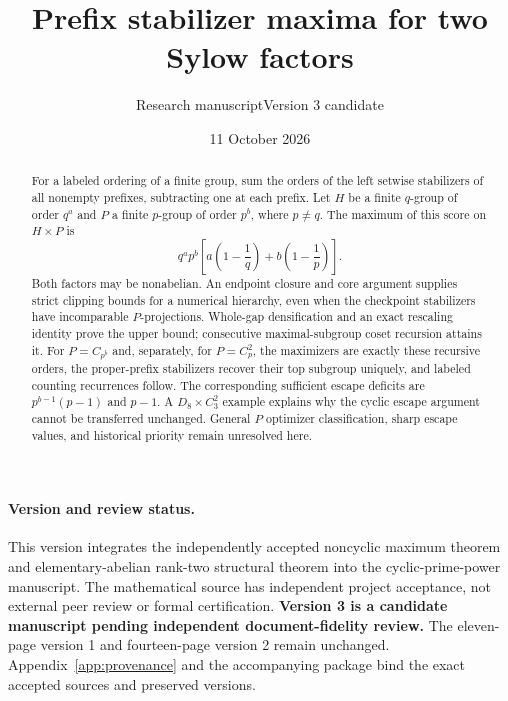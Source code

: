 \documentclass[11pt,letterpaper]{article}
\title{\bfseries Prefix stabilizer maxima for two Sylow factors}
\author{Research manuscript\quad Version 3 candidate}
\date{11 October 2026}
\theoremstyle{definition}\newtheorem{definition}{Definition}
\begin{document}
\maketitle\thispagestyle{plain}
\begin{abstract}
For a labeled ordering of a finite group, sum the orders of the left setwise stabilizers of all nonempty prefixes, subtracting one at each prefix. Let $H$ be a finite $q$-group of order $q^a$ and $P$ a finite $p$-group of order $p^b$, where $p\ne q$. The maximum of this score on $H\times P$ is
\[
q^ap^b\left[a\left(1-\frac1q\right)+b\left(1-\frac1p\right)\right].
\]
Both factors may be nonabelian. An endpoint closure and core argument supplies strict clipping bounds for a numerical hierarchy, even when the checkpoint stabilizers have incomparable $P$-projections. Whole-gap densification and an exact rescaling identity prove the upper bound; consecutive maximal-subgroup coset recursion attains it. For $P=C_{p^b}$ and, separately, for $P=C_p^2$, the maximizers are exactly these recursive orders, the proper-prefix stabilizers recover their top subgroup uniquely, and labeled counting recurrences follow. The corresponding sufficient escape deficits are $p^{b-1}(p-1)$ and $p-1$. A $D_8\times C_3^2$ example explains why the cyclic escape argument cannot be transferred unchanged. General $P$ optimizer classification, sharp escape values, and historical priority remain unresolved here.
\end{abstract}

\paragraph{Version and review status.}
This version integrates the independently accepted noncyclic maximum theorem and elementary-abelian rank-two structural theorem into the cyclic-prime-power manuscript. The mathematical source has independent project acceptance, not external peer review or formal certification. \textbf{Version 3 is a candidate manuscript pending independent document-fidelity review.} The eleven-page version 1 and fourteen-page version 2 remain unchanged. Appendix~\ref{app:provenance} and the accompanying package bind the exact accepted sources and preserved versions.
\end{document}
